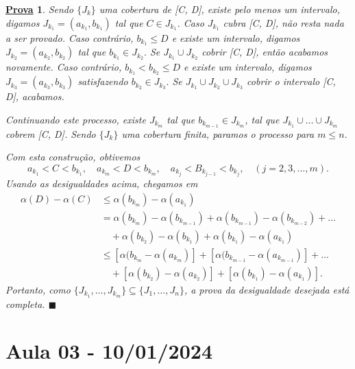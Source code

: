 \documentclass{article}
\newtheorem*{proof*}{\underline{Prova}}
\renewcommand\qedsymbol{$\blacksquare$}
\begin{document}
\begin{proof*}
	Sendo \(\{J_{k}\}\) uma cobertura de [C, D], existe pelo menos um intervalo, digamos \(J_{k_1} = (a_{k_{1}}, b_{k_{1}})\) tal que \(C\in J_{k_{1}}\). Caso \(J_{k_{1}}\) cubra [C, D],
	não resta nada a ser provado.
	Caso contrário, \(b_{k_{1}} \leq D\) e existe um intervalo, digamos \(J_{k_{2}} = (a_{k_{2}}, b_{k_{2}})\) tal que \(b_{k_{1}}\in J_{k_{2}}.\) Se \(J_{k_{1}}\cup J_{k_{2}}\)
	cobrir [C, D], então acabamos novamente.
	Caso contrário, \(b_{k_{1}} < b_{k_{2}} \leq D\) e existe um intervalo, digamos \(J_{k_{3}} = (a_{k_{3}}, b_{k_{3}})\) satisfazendo \(b_{k_{2}}\in J_{k_{3}}.\)
	Se \(J_{k_{1}}\cup J_{k_{2}}\cup J_{k_{3}}\) cobrir o intervalo [C, D], acabamos.

	Continuando este processo, existe \(J_{k_{m}}\) tal que \(b_{k_{m-1}}\in J_{k_{m}}\), tal que \(J_{k_{1}}\cup \dotsc \cup J_{k_{m}}\) cobrem [C, D]. Sendo \(\{J_{k}\} \) uma cobertura finita, paramos
	o processo para \(m \leq n\).

	Com esta construção, obtivemos
	\[
		a_{k_{1}} < C < b_{k_{1}},\quad a_{k_{m}} < D < b_{k_{m}}, \quad a_{k_{j}} < B_{k_{j-1}} < b_{k_{j}},\quad (j = 2, 3, \dotsc , m).
	\]
	Usando as desigualdades acima, chegamos em
	\begin{align*}
		\alpha (D) - \alpha (C) & \leq \alpha (b_{k_{m}}) - \alpha (a_{k_{1}})                                                          \\
		                        & = \alpha (b_{k_{m}}) - \alpha (b_{k_{m-1}}) + \alpha (b_{k_{m-1}}) - \alpha (b_{k_{m-2}}) + \dotsc    \\
		                        & \quad +\alpha (b_{k_{2}}) - \alpha (b_{k_{1}}) + \alpha (b_{k_{1}}) - \alpha (a_{k_{1}})              \\
		                        & \leq [\alpha (b_{k_{m}} - \alpha (a_{k_{m}})] + [\alpha (b_{k_{m-1}} - \alpha (a_{k_{m-1}})] + \dotsc \\
		                        & \quad + [\alpha (b_{k_{2}}) - \alpha (a_{k_{2}})] + [\alpha (b_{k_{1}}) - \alpha (a_{k_{1}})].
	\end{align*}
	Portanto, como \(\{J_{k_{1}},\dotsc ,J_{k_{m}}\}\subseteq \{J_{1},\dotsc ,J_{n}\}\), a prova da desigualdade desejada está completa. \qedsymbol
\end{proof*}
\newpage

\section{Aula 03 - 10/01/2024}
\end{document}
